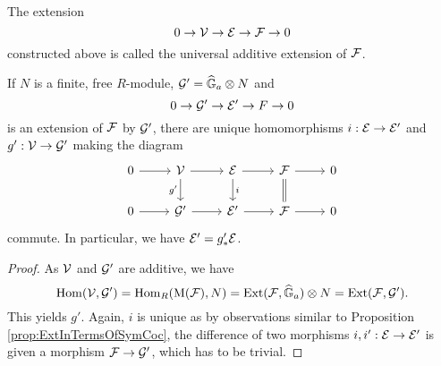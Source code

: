 \documentclass[../main.tex]{subfiles}
\begin{document}
\begin{defi}
  The extension
  \begin{equation*}
    0 \to \mathcal{V} \to \mathcal{E} \to \mathcal{F} \to 0
  \end{equation*}
  constructed above is called the universal additive extension of $\mathcal{F}$.
\end{defi}

\begin{prop}
  If $N$ is a finite, free $R$-module, $\mathcal{G}' = \widehat{\mathbb{G}}_a \otimes N$ and 
  \begin{equation*}
    0 \to \mathcal{G}' \to \mathcal{E}' \to F \to 0
  \end{equation*}
  is an extension of $\mathcal{F}$ by $\mathcal{G}'$, there are unique homomorphisms
    $i: \mathcal{E} \to \mathcal{E}'$ and $g': \mathcal{V} \to \mathcal{G}'$ making the diagram
  \begin{equation*}
\begin{tikzcd}[ampersand replacement=\&]
	0 \& {\cV} \& \cE \& \cF \& 0 \\
	0 \& {\cG'} \& {\cE'} \& \cF \& 0
	\arrow[from=1-1, to=1-2]
	\arrow[from=1-2, to=1-3]
	\arrow["{g'}"', from=1-2, to=2-2]
	\arrow[from=1-3, to=1-4]
	\arrow["i", from=1-3, to=2-3]
	\arrow[from=1-4, to=1-5]
	\arrow[Rightarrow, no head, from=1-4, to=2-4]
	\arrow[from=2-1, to=2-2]
	\arrow[from=2-2, to=2-3]
	\arrow[from=2-3, to=2-4]
	\arrow[from=2-4, to=2-5]
\end{tikzcd}
  \end{equation*}
  commute. In particular, we have $\mathcal{E}' = g'_* \mathcal{E}$. 
\begin{proof}
  As $\mathcal{V}$ and $\mathcal{G}'$ are additive, we have
  \begin{equation*}
    \operatorname{Hom}(\mathcal{V}, \mathcal{G}') = \operatorname{Hom}_R(\mathrm M(\mathcal{F}), N) = \operatorname{Ext}(\mathcal{F}, \widehat{\mathbb{G}}_a) \otimes N =
    \operatorname{Ext}(\mathcal{F}, \mathcal{G}').
  \end{equation*}
  This yields $g'$. Again, $i$ is unique as by observations similar to 
  Proposition \ref{prop:ExtInTermsOfSymCoc}, the difference of two
  morphisms $i,i':\mathcal{E} \to \mathcal{E}'$ is given a morphism $\mathcal{F} \to \mathcal{G}'$, which has
  to be trivial.
\end{proof}
\end{prop}
\end{document}
